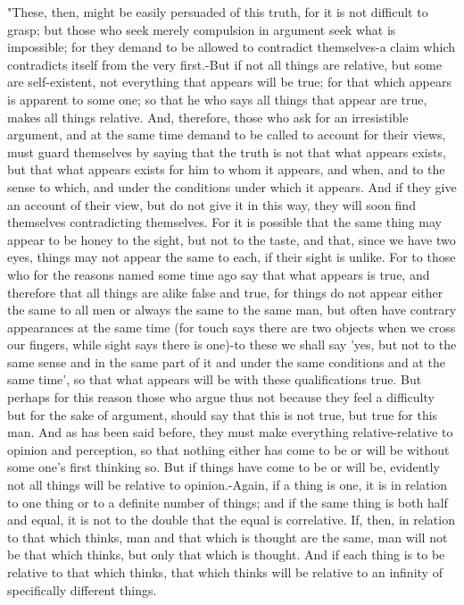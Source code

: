 "These, then, might be easily persuaded of this truth, for it is not
difficult to grasp; but those who seek merely compulsion in argument
seek what is impossible; for they demand to be allowed to contradict
themselves-a claim which contradicts itself from the very first.-But
if not all things are relative, but some are self-existent, not everything
that appears will be true; for that which appears is apparent to some
one; so that he who says all things that appear are true, makes all
things relative. And, therefore, those who ask for an irresistible
argument, and at the same time demand to be called to account for
their views, must guard themselves by saying that the truth is not
that what appears exists, but that what appears exists for him to
whom it appears, and when, and to the sense to which, and under the
conditions under which it appears. And if they give an account of
their view, but do not give it in this way, they will soon find themselves
contradicting themselves. For it is possible that the same thing may
appear to be honey to the sight, but not to the taste, and that, since
we have two eyes, things may not appear the same to each, if their
sight is unlike. For to those who for the reasons named some time
ago say that what appears is true, and therefore that all things are
alike false and true, for things do not appear either the same to
all men or always the same to the same man, but often have contrary
appearances at the same time (for touch says there are two objects
when we cross our fingers, while sight says there is one)-to these
we shall say 'yes, but not to the same sense and in the same part
of it and under the same conditions and at the same time', so that
what appears will be with these qualifications true. But perhaps for
this reason those who argue thus not because they feel a difficulty
but for the sake of argument, should say that this is not true, but
true for this man. And as has been said before, they must make everything
relative-relative to opinion and perception, so that nothing either
has come to be or will be without some one's first thinking so. But
if things have come to be or will be, evidently not all things will
be relative to opinion.-Again, if a thing is one, it is in relation
to one thing or to a definite number of things; and if the same thing
is both half and equal, it is not to the double that the equal is
correlative. If, then, in relation to that which thinks, man and that
which is thought are the same, man will not be that which thinks,
but only that which is thought. And if each thing is to be relative
to that which thinks, that which thinks will be relative to an infinity
of specifically different things. 

